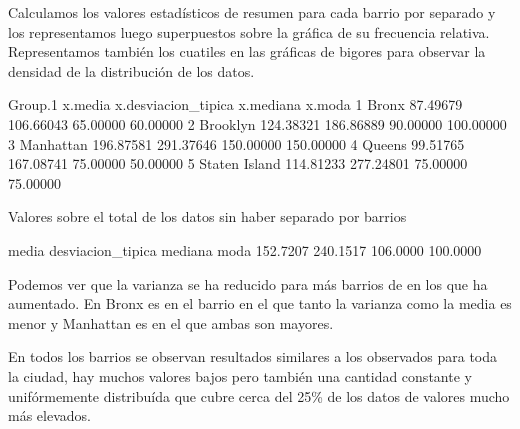 \documentclass [a4paper] {article}
\begin{document}
Calculamos los valores estadísticos de resumen para cada barrio por separado y los representamos luego superpuestos sobre la gráfica de su frecuencia relativa.
Representamos también los cuatiles en las gráficas de bigores para observar la densidad de la distribución de los datos.
\begin{Schunk}
\begin{Soutput}
        Group.1   x.media x.desviacion_tipica x.mediana    x.moda
1         Bronx  87.49679           106.66043  65.00000  60.00000
2      Brooklyn 124.38321           186.86889  90.00000 100.00000
3     Manhattan 196.87581           291.37646 150.00000 150.00000
4        Queens  99.51765           167.08741  75.00000  50.00000
5 Staten Island 114.81233           277.24801  75.00000  75.00000
\end{Soutput}
\end{Schunk}
Valores sobre el total de los datos sin haber separado por barrios
\begin{Schunk}
\begin{Soutput}
            media desviacion_tipica           mediana              moda 
         152.7207          240.1517          106.0000          100.0000 
\end{Soutput}
\end{Schunk}

Podemos ver que la varianza se ha reducido para más barrios de en los que ha aumentado.
En Bronx es en el barrio en el que tanto la varianza como la media es menor y 
Manhattan es en el que ambas son mayores.

En todos los barrios se observan resultados similares a los observados para toda la ciudad, hay muchos valores bajos pero también una cantidad constante y 
unifórmemente distribuída que cubre cerca del 25\% de los datos de valores mucho más elevados.
\end{document}
